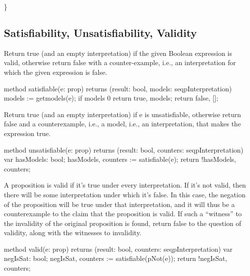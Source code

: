 \documentclass[letterpaper,10pt,english]{sphinxmanual}
\begin{document}
\}


\subsection{Satisfiability, Unsatisfiability, Validity}
\label{\detokenize{12-satisfiability:satisfiability-unsatisfiability-validity}}
Return true (and an empty interpretation) if the given Boolean
expression is valid, otherwise return false with a counter-example,
i.e., an interpretation for which the given expression is false.

\begin{sphinxVerbatim}[commandchars=\\\{\}]
method satisfiable(e: prop) returns (result: bool,
                                     models: seq\PYGZlt{}pInterpretation\PYGZgt{})
\PYGZob{}
    models := get\PYGZus{}models(e);
    if \textbar{} models \textbar{} \PYGZgt{} 0 \PYGZob{} return true, models; \PYGZcb{}
    return false, [];
\PYGZcb{}
\end{sphinxVerbatim}

Return true (and an empty interpretation) if e is unsatisfiable,
otherwise return false and a counterexample, i.e., a model, i.e., an
interpretation, that makes the expression true.

\begin{sphinxVerbatim}[commandchars=\\\{\}]
method unsatisfiable(e: prop)
    returns (result: bool,
             counters: seq\PYGZlt{}pInterpretation\PYGZgt{})
\PYGZob{}
    var hasModels: bool;
    hasModels, counters := satisfiable(e);
    return !hasModels, counters;
\PYGZcb{}
\end{sphinxVerbatim}

A proposition is valid if it’s true under every interpretation. If
it’s not valid, then there will be some interpretation under which
it’s false. In this case, the negation of the proposition will be true
under that interpretation, and it will thus be a counterexample to the
claim that the proposition is valid. If such a “witness” to the
invalidity of the original proposition is found, return false to the
question of validity, along with the witnesses to invalidity.

\begin{sphinxVerbatim}[commandchars=\\\{\}]
method valid(e: prop) returns (result: bool,
                               counters: seq\PYGZlt{}pInterpretation\PYGZgt{})
\PYGZob{}
    var negIsSat: bool;
    negIsSat, counters := satisfiable(pNot(e));
    return !negIsSat, counters;
\PYGZcb{}
\end{sphinxVerbatim}
\end{document}
